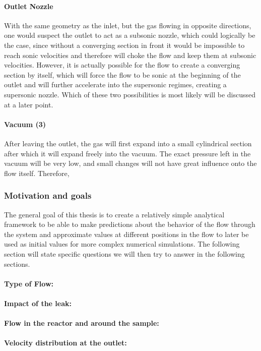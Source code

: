 \paragraph{Outlet Nozzle}
With the same geometry as the inlet, but the gas flowing in opposite directions, one would suspect the outlet to act as a subsonic nozzle, which could logically be the case, since without a converging section in front it would be impossible to reach sonic velocities and therefore will choke the flow and keep them at subsonic velocities. However, it is actually possible for the flow to create a converging section by itself, which will force the flow to be sonic at the beginning of the outlet and will further accelerate into the supersonic regimes, creating a supersonic nozzle. Which of these two possibilities is most likely will be discussed at a later point.

\paragraph{Vacuum (3)}
After leaving the outlet, the gas will first expand into a small cylindrical section after which it will expand freely into the vacuum. The exact pressure left in the vacuum will be very low, and small changes will not have great influence onto the flow itself. Therefore,

\newpage

\subsubsection{Motivation and goals}
The general goal of this thesis is to create a relatively simple analytical framework to be able to make predictions about the behavior of the flow through the system and approximate values at different positions in the flow to later be used as initial values for more complex numerical simulations. The following section will state specific questions we will then try to answer in the following sections.

\paragraph{Type of Flow:}

\paragraph{Impact of the leak:}

\paragraph{Flow in the reactor and around the sample:}

\paragraph{Velocity distribution at the outlet:}

